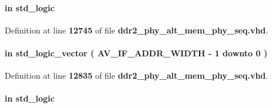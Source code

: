 \paragraph[{ctl\+\_\+recalibrate\+\_\+req}]{ {\bfseries \textcolor{keywordflow}{in}\textcolor{vhdlchar}{ }} {\bfseries \textcolor{comment}{std\+\_\+logic}\textcolor{vhdlchar}{ }} \hspace{0.3cm}{\ttfamily [Port]}}\label{classddr2__phy__alt__mem__phy__seq_ab19e0bf0cc001ceaeeb1109bdb0f5286}


Definition at line {\bf 12745} of file {\bf ddr2\+\_\+phy\+\_\+alt\+\_\+mem\+\_\+phy\+\_\+seq.\+vhd}.

\paragraph[{dbg\+\_\+seq\+\_\+addr}]{ {\bfseries \textcolor{keywordflow}{in}\textcolor{vhdlchar}{ }} {\bfseries \textcolor{comment}{std\+\_\+logic\+\_\+vector}\textcolor{vhdlchar}{ }\textcolor{vhdlchar}{(}\textcolor{vhdlchar}{ }\textcolor{vhdlchar}{ }\textcolor{vhdlchar}{ }\textcolor{vhdlchar}{ }{\bfseries {\bf A\+V\+\_\+\+I\+F\+\_\+\+A\+D\+D\+R\+\_\+\+W\+I\+D\+TH}} \textcolor{vhdlchar}{-\/}\textcolor{vhdlchar}{ } \textcolor{vhdldigit}{1} \textcolor{vhdlchar}{ }\textcolor{keywordflow}{downto}\textcolor{vhdlchar}{ }\textcolor{vhdlchar}{ } \textcolor{vhdldigit}{0} \textcolor{vhdlchar}{ }\textcolor{vhdlchar}{)}\textcolor{vhdlchar}{ }} \hspace{0.3cm}{\ttfamily [Port]}}\label{classddr2__phy__alt__mem__phy__seq_a2fdcbc0f05f2b2ce0afecf6718af1e7a}


Definition at line {\bf 12835} of file {\bf ddr2\+\_\+phy\+\_\+alt\+\_\+mem\+\_\+phy\+\_\+seq.\+vhd}.

\paragraph[{dbg\+\_\+seq\+\_\+clk}]{ {\bfseries \textcolor{keywordflow}{in}\textcolor{vhdlchar}{ }} {\bfseries \textcolor{comment}{std\+\_\+logic}\textcolor{vhdlchar}{ }} \hspace{0.3cm}{\ttfamily [Port]}}\label{classddr2__phy__alt__mem__phy__seq_ae2bb64e010025d55b496ef67669b6318}


